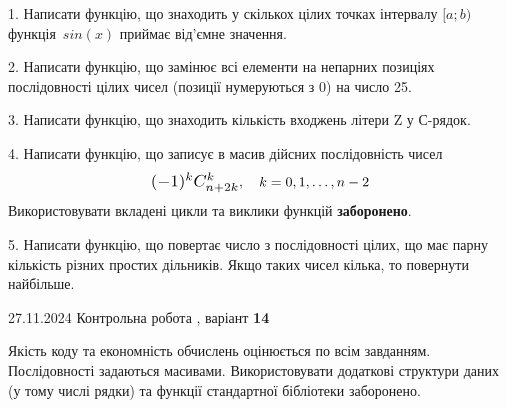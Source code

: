 \documentclass[12pt, ukrainian]{article}
\begin{document}
{{{{{{{{{{{{{\vspace{2mm}

\begin {large}
1. Написати функцію, що знаходить у скількох цілих точках інтервалу $[a; b)$ функція~$sin(x)$ приймає від'ємне значення.

\vspace{2mm}


2. Написати функцію, що замінює всі елементи на непарних позиціях послідовності цілих чисел (позиції нумеруються з 0) на число 25.

\vspace{2mm}


3. Написати функцію, що знаходить кількість входжень літери Z у С-рядок.

\vspace{2mm}


4. 
Написати функцію, що записує в масив дійсних послідовність чисел
$$\scalebox{1.2}{$(-1)^{k}C_{n+2k}^{k}$}, \quad k=0,1,\ldots,n-2$$
Використовувати вкладені цикли та виклики функцій \textbf{заборонено}.

\vspace{2mm}


5. Написати функцію, що повертає число з послідовності цілих, що має парну кількість різних простих дільників. Якщо таких чисел кілька, то повернути найбільше.

\vspace{2mm}

\end{large}
\vspace{35mm}


{{27.11.2024 Контрольна робота , варіант  \No \textbf { 14 }\par}}


{
Якість коду та економність обчислень оцінюється по всім завданням. Послідовності задаються масивами. Використовувати додаткові структури даних (у тому числі рядки) та функції стандартної бібліотеки заборонено.

}}}}}}}}}}}}}}
\end{document}
